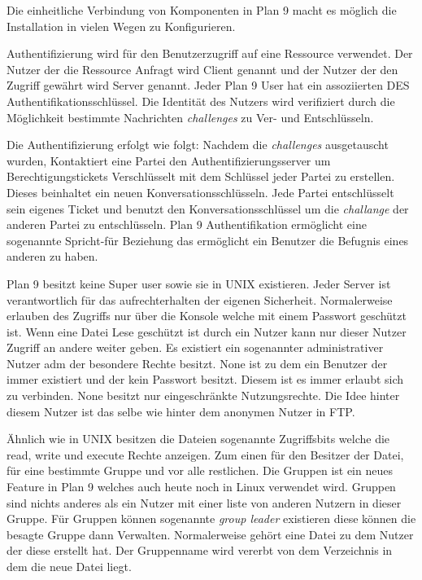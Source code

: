 \documentclass[9pt,technote]{IEEEtran}
\begin{document}
        Die einheitliche Verbindung von Komponenten in Plan 9 macht es m\"oglich die Installation in vielen Wegen zu Konfigurieren.
        
        Authentifizierung wird f\"ur den Benutzerzugriff auf eine Ressource verwendet. Der Nutzer der die Ressource Anfragt wird Client genannt und der
        Nutzer der den Zugriff gew\"ahrt wird Server genannt. Jeder Plan 9 User hat ein assoziierten DES Authentifikationsschl\"ussel. Die Identit\"at
        des Nutzers wird verifiziert durch die M\"oglichkeit bestimmte Nachrichten \textit{challenges} zu Ver- und Entschl\"usseln.
        
        Die Authentifizierung erfolgt wie folgt: Nachdem die \textit{challenges} ausgetauscht wurden, 
        Kontaktiert eine Partei  den Authentifizierungsserver um Berechtigungstickets Verschl\"usselt
        mit dem Schl\"ussel jeder Partei zu erstellen. Dieses beinhaltet ein neuen Konversationsschl\"usseln.
        Jede Partei entschl\"usselt sein eigenes Ticket und benutzt den Konversationsschl\"ussel
       um die \textit{challange} der anderen Partei zu entschl\"usseln. Plan 9 Authentifikation erm\"oglicht eine 
       sogenannte Spricht-f\"ur Beziehung das erm\"oglicht ein Benutzer
       die Befugnis eines anderen zu haben.
       
       Plan 9 besitzt keine Super user sowie sie in UNIX existieren. Jeder Server ist verantwortlich f\"ur das aufrechterhalten der eigenen Sicherheit.
       Normalerweise erlauben des Zugriffs nur \"uber die Konsole welche mit einem Passwort gesch\"utzt ist.
       Wenn eine Datei Lese gesch\"utzt ist durch ein Nutzer kann
       nur dieser Nutzer Zugriff an andere weiter geben. Es existiert ein sogenannter administrativer Nutzer adm der besondere Rechte besitzt. 
       None ist zu dem ein Benutzer
       der immer existiert und der kein Passwort besitzt. Diesem ist es immer erlaubt sich zu verbinden. None besitzt nur eingeschr\"ankte Nutzungsrechte.
       Die Idee hinter diesem Nutzer ist das selbe wie hinter dem anonymen Nutzer in FTP.
       
       \"Ahnlich wie in UNIX besitzen die Dateien sogenannte Zugriffsbits welche die read, write und execute Rechte anzeigen. 
       Zum einen f\"ur den Besitzer der Datei, f\"ur eine bestimmte
       Gruppe und vor alle restlichen. Die Gruppen ist ein neues Feature in Plan 9 welches auch heute noch in Linux verwendet wird. Gruppen sind nichts anderes
       als ein Nutzer mit einer liste von anderen Nutzern in dieser Gruppe. F\"ur Gruppen k\"onnen sogenannte \textit{group leader} existieren diese k\"onnen die
       besagte Gruppe dann Verwalten. Normalerweise geh\"ort eine Datei zu dem Nutzer der diese erstellt hat. 
       Der Gruppenname wird vererbt von dem Verzeichnis in dem die neue Datei liegt.
\end{document}
